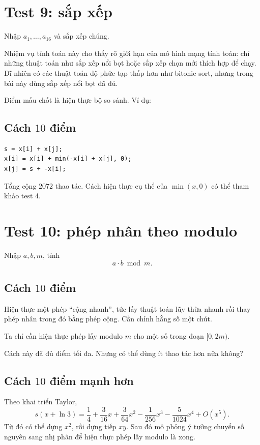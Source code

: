 \documentclass[11pt]{article}
\begin{document}
\section{Test 9: sắp xếp}

Nhập $a_1,\ldots,a_{16}$ và sắp xếp chúng.

Nhiệm vụ tính toán này cho thấy rõ giới hạn của mô hình mạng tính toán: chỉ
những thuật toán như sắp xếp nổi bọt hoặc sắp xếp chọn mới thích hợp để chạy.
Dĩ nhiên có các thuật toán độ phức tạp thấp hơn như bitonic sort, nhưng trong
bài này dùng sắp xếp nổi bọt đã đủ.

Điểm mấu chốt là hiện thực bộ so sánh. Ví dụ:

\subsection*{Cách $10$ điểm}

\begin{verbatim}
s = x[i] + x[j];
x[i] = x[i] + min(-x[i] + x[j], 0);
x[j] = s + -x[i];
\end{verbatim}

Tổng cộng $2072$ thao tác. Cách hiện thực cụ thể của $\min(x,0)$ có thể tham
khảo test 4.

\section{Test 10: phép nhân theo modulo}

Nhập $a,b,m$, tính
\[
  a\cdot b\bmod m.
\]

\subsection*{Cách $10$ điểm}

Hiện thực một phép ``cộng nhanh'', tức lấy thuật toán lũy thừa nhanh rồi thay
phép nhân trong đó bằng phép cộng. Cần chỉnh hằng số một chút.

Ta chỉ cần hiện thực phép lấy modulo $m$ cho một số trong đoạn $[0,2m)$.

Cách này đã đủ điểm tối đa. Nhưng có thể dùng ít thao tác hơn nữa không?

\subsection*{Cách $10$ điểm mạnh hơn}

Theo khai triển Taylor,
\[
  s(x+\ln 3)
  = \frac14+\frac{3}{16}x+\frac{3}{64}x^2
    -\frac{1}{256}x^3-\frac{5}{1024}x^4+O(x^5).
\]
Từ đó có thể dựng $x^2$, rồi dựng tiếp $xy$. Sau đó mô phỏng ý tưởng chuyển
số nguyên sang nhị phân để hiện thực phép lấy modulo là xong.
\end{document}
